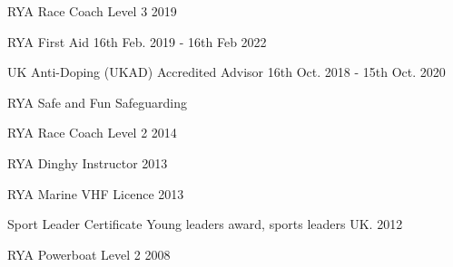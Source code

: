 

\begin{cvskills}

  \cvskill 
    {RYA Race Coach Level 3} %
    {2019} %

  \cvskill 
    {RYA First Aid} %
    {16th Feb. 2019 - 16th Feb 2022} %

 
  \cvskill
    {UK Anti-Doping (UKAD) Accredited Advisor} %
    {16th Oct. 2018 - 15th Oct. 2020} %
    

 \cvskill
    {RYA Safe and Fun Safeguarding} %
    {}

  \cvskill
    {RYA Race Coach Level 2} %
    {2014}

 
   \cvskill
    {RYA Dinghy Instructor} %
    {2013}


  \cvskill
    {RYA Marine VHF Licence} %
    {2013}


  \cvskill
    {Sport Leader Certificate} %
    {Young leaders award, sports leaders UK. 2012}

 
   \cvskill
    {RYA Powerboat Level 2} %
    {2008}


 \end{cvskills}
